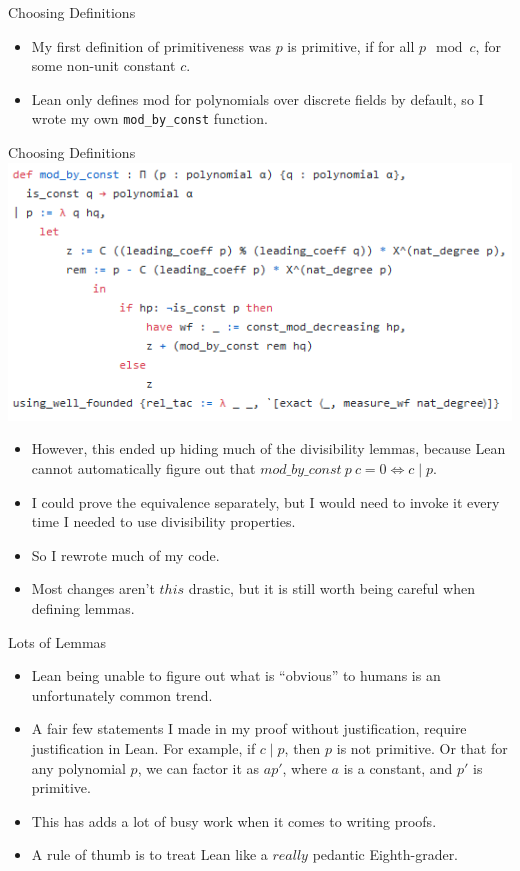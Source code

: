 \documentclass{beamer}
\begin{document}
\begin{frame}{Choosing Definitions}
  \begin{itemize}
    \item My first definition of primitiveness was $p$ is primitive, if for all $p \mod c$, for some non-unit constant $c$. 
    \item Lean only defines mod for polynomials over discrete fields by default, so I wrote my own \texttt{mod\_by\_const} function. 
  \end{itemize}
\end{frame}

\begin{frame}{Choosing Definitions}
  \includegraphics[width=\textwidth]{const_mod.png}
\end{frame}

\begin{frame}
  \begin{itemize}
    \item  However, this ended up hiding much of the divisibility lemmas, because Lean cannot automatically figure out that $mod\_by\_const\ p\ c = 0 \iff c \mid p$. 
    \item I could prove the equivalence separately, but I would need to invoke it every time I needed to use divisibility properties.
    \item So I rewrote much of my code.  
    \item Most changes aren't $this$ drastic, but it is still worth being careful when defining lemmas.
  \end{itemize}
\end{frame}

\begin{frame}{Lots of Lemmas}  
  \begin{itemize}
    \item Lean being unable to figure out what is ``obvious'' to humans is an unfortunately common trend. 
    \item A fair few statements I made in my proof without justification, require justification in Lean. For example, if $c \mid p$, then $p$ is not primitive. Or that for any polynomial $p$, we can factor it as $ap'$, where $a$ is a constant, and $p'$ is primitive. 
    \item This has adds a lot of busy work when it comes to writing proofs. 
    \item A rule of thumb is to treat Lean like a $really$ pedantic Eighth-grader. 
  \end{itemize}
  
\end{frame}
\end{document}
